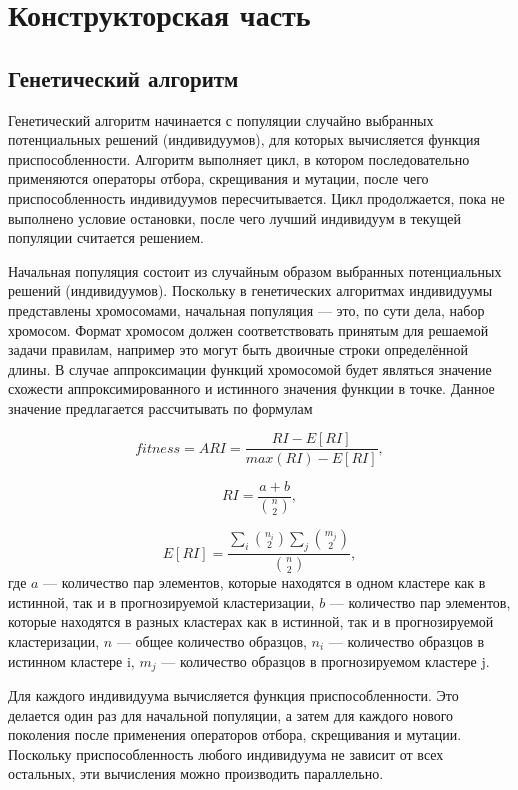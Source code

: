 \chapter{Конструкторская часть}

\section{Генетический алгоритм}

Генетический алгоритм начинается с популяции случайно выбранных потенциальных решений (индивидуумов), для которых вычисляется функция приспособленности. Алгоритм выполняет цикл, в котором последовательно применяются операторы отбора, скрещивания и мутации, после чего приспособленность индивидуумов пересчитывается. Цикл продолжается, пока не выполнено условие остановки, после чего лучший индивидуум в текущей популяции считается решением.

Начальная популяция состоит из случайным образом выбранных потенциальных решений (индивидуумов). Поскольку в генетических алгоритмах индивидуумы представлены хромосомами, начальная популяция ---  это, по сути дела, набор хромосом. Формат хромосом должен соответствовать принятым для решаемой задачи правилам, например это могут быть двоичные строки определённой длины. В случае аппроксимации функций хромосомой будет являться значение схожести аппроксимированного и истинного значения функции в точке. Данное значение предлагается рассчитывать по формулам

\label{fitness}
\begin{equation}
	fitness =  ARI = \frac{RI - E[RI]}{max(RI) - E[RI]},
\end{equation}

\begin{equation}
	RI = \frac{a + b}{{{n \choose 2}}},
\end{equation}

\begin{equation}
	E[RI] = \frac{\sum_i {{n_i \choose 2}} \sum_j {{m_j \choose 2}}}{{n \choose 2}},
\end{equation}
где $a$ --- количество пар элементов, которые находятся в одном кластере как в истинной, так и в прогнозируемой кластеризации, $b$ --- количество пар элементов, которые находятся в разных кластерах как в истинной, так и в прогнозируемой кластеризации, $n$ --- общее количество образцов, $n_i$ --- количество образцов в истинном кластере i, $m_j$ --- количество образцов в прогнозируемом кластере j.

Для каждого индивидуума вычисляется функция приспособленности. Это делается один раз для начальной популяции, а затем для каждого нового поколения после применения операторов отбора, скрещивания и мутации. Поскольку приспособленность любого индивидуума не зависит от всех остальных, эти вычисления можно производить параллельно.

